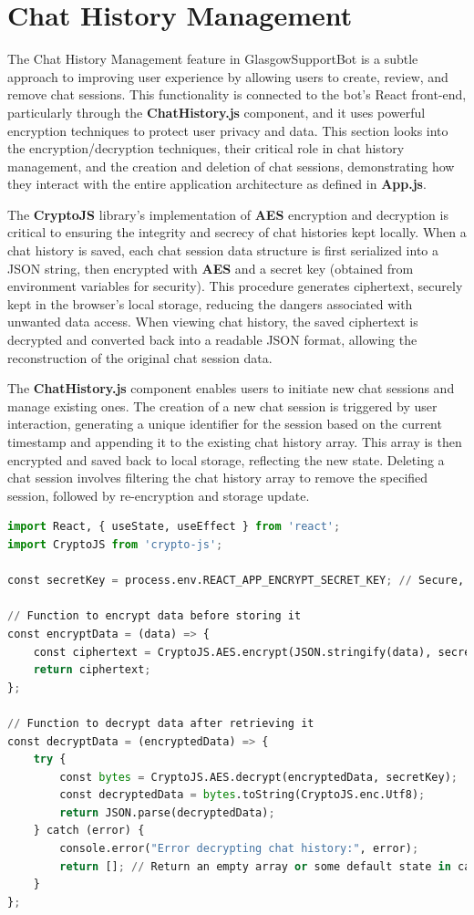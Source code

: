 \documentclass{l4proj}
\begin{document}
\section{Chat History Management}

The Chat History Management feature in GlasgowSupportBot is a subtle approach to improving user experience by allowing users to create, review, and remove chat sessions. This functionality is connected to the bot's React front-end, particularly through the \textbf{ChatHistory.js} component, and it uses powerful encryption techniques to protect user privacy and data. This section looks into the encryption/decryption techniques, their critical role in chat history management, and the creation and deletion of chat sessions, demonstrating how they interact with the entire application architecture as defined in \textbf{App.js}.

The \textbf{CryptoJS} library's implementation of \textbf{AES} encryption and decryption is critical to ensuring the integrity and secrecy of chat histories kept locally. When a chat history is saved, each chat session data structure is first serialized into a JSON string, then encrypted with \textbf{AES} and a secret key (obtained from environment variables for security). This procedure generates ciphertext, securely kept in the browser's local storage, reducing the dangers associated with unwanted data access. When viewing chat history, the saved ciphertext is decrypted and converted back into a readable JSON format, allowing the reconstruction of the original chat session data. 

The \textbf{ChatHistory.js} component enables users to initiate new chat sessions and manage existing ones. The creation of a new chat session is triggered by user interaction, generating a unique identifier for the session based on the current timestamp and appending it to the existing chat history array. This array is then encrypted and saved back to local storage, reflecting the new state. Deleting a chat session involves filtering the chat history array to remove the specified session, followed by re-encryption and storage update. 

\begin{lstlisting}[language=Python, caption={Encryption and Decryption Functions}]
import React, { useState, useEffect } from 'react';
import CryptoJS from 'crypto-js';

const secretKey = process.env.REACT_APP_ENCRYPT_SECRET_KEY; // Secure, randomly generated key here

// Function to encrypt data before storing it
const encryptData = (data) => {
    const ciphertext = CryptoJS.AES.encrypt(JSON.stringify(data), secretKey).toString();
    return ciphertext;
};

// Function to decrypt data after retrieving it
const decryptData = (encryptedData) => {
    try {
        const bytes = CryptoJS.AES.decrypt(encryptedData, secretKey);
        const decryptedData = bytes.toString(CryptoJS.enc.Utf8);
        return JSON.parse(decryptedData);
    } catch (error) {
        console.error("Error decrypting chat history:", error);
        return []; // Return an empty array or some default state in case of error
    }
};
\end{lstlisting}
\end{document}
